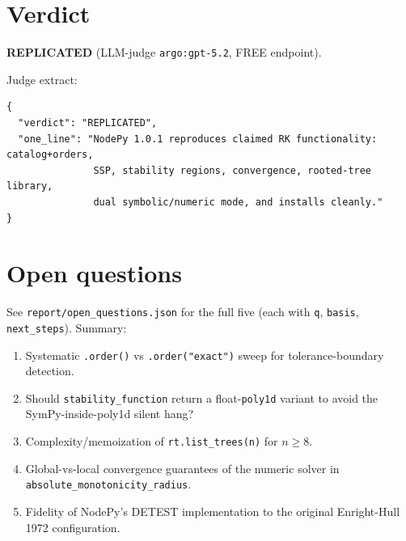 \documentclass[11pt]{article}
\begin{document}
\section{Verdict}
\textbf{REPLICATED} (LLM-judge \texttt{argo:gpt-5.2}, FREE endpoint).

Judge extract:
\begin{lstlisting}
{
  "verdict": "REPLICATED",
  "one_line": "NodePy 1.0.1 reproduces claimed RK functionality: catalog+orders,
               SSP, stability regions, convergence, rooted-tree library,
               dual symbolic/numeric mode, and installs cleanly."
}
\end{lstlisting}

\section*{Open questions}
See \texttt{report/open\_questions.json} for the full five (each with \texttt{q},
\texttt{basis}, \texttt{next\_steps}). Summary:
\begin{enumerate}
\item Systematic \texttt{.order()} vs \texttt{.order("exact")} sweep for tolerance-boundary detection.
\item Should \texttt{stability\_function} return a float-\texttt{poly1d} variant to avoid the SymPy-inside-poly1d silent hang?
\item Complexity/memoization of \texttt{rt.list\_trees(n)} for \(n\ge 8\).
\item Global-vs-local convergence guarantees of the numeric solver in \texttt{absolute\_monotonicity\_radius}.
\item Fidelity of NodePy's DETEST implementation to the original Enright-Hull 1972 configuration.
\end{enumerate}
\end{document}
